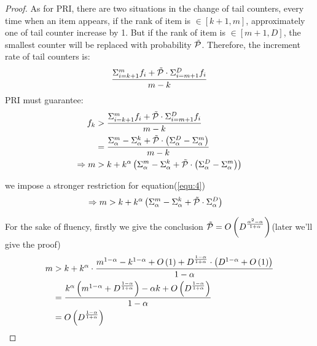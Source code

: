 \begin{proof}
As for PRI, there are two situations in the change of tail counters, every time when an item appears, if the rank of item is $\in[k+1,m]$, approximately one of tail counter increase by 1. But if the rank of item is $\in[m+1,D]$, the smallest counter will be replaced with probability $\Tilde{\mathcal{P}}$.
Therefore, the increment rate of tail counters is:
\begin{equation}
\begin{aligned}
\centering
    \label{equ:5}
    \frac{\Sigma_{i=k+1}^m{f_i}+\Tilde{\mathcal{P}}\cdot\Sigma_{i=m+1}^D{f_i}}{m-k}
\end{aligned}
\end{equation}   
PRI must guarantee:
\begin{equation}
\begin{aligned}
\centering  
    f_k &> \frac{\Sigma_{i=k+1}^m{f_i}+\Tilde{\mathcal{P}}\cdot\Sigma_{i=m+1}^D{f_i}}{m-k}\\
        &= \frac{\Sigma_\alpha^m-\Sigma_\alpha^k+\Tilde{\mathcal{P}}\cdot\left(\Sigma_\alpha^D-\Sigma_\alpha^m\right)}{m-k}\\
    \Rightarrow m &> k + k^\alpha\left(\Sigma_\alpha^m-\Sigma_\alpha^k+\Tilde{\mathcal{P}}\cdot\left(\Sigma_\alpha^D-\Sigma_\alpha^m\right)\right)
\end{aligned}
\end{equation}

we impose a stronger restriction for equation(\ref{equ:4}) 
\begin{equation}
\begin{aligned}
\centering
    \label{equ:6}
    \Rightarrow m &> k + k^\alpha\left(\Sigma_\alpha^m-\Sigma_\alpha^k+\Tilde{\mathcal{P}}\cdot\Sigma_\alpha^D\right)
\end{aligned}
\end{equation} 

For the sake of fluency, firstly we give the conclusion $\Tilde{\mathcal{P}} = O\left(D^{\frac{\alpha^2-\alpha}{1+\alpha}}\right)$(later we'll give the proof)
\begin{equation}
\begin{aligned}
\centering  
    m &> k + k^\alpha\cdot\frac{m^{1-\alpha}-k^{1-\alpha}+O\left(1\right)+D^\frac{1-\alpha}{1+\alpha}\cdot \left(D^{1-\alpha}+O\left(1\right)\right)}{1-\alpha}\\
    &= \frac{k^\alpha\left(m^{1-\alpha}+D^\frac{1-\alpha}{1+\alpha}\right)-\alpha k+O\left(D^\frac{1-\alpha}{1+\alpha}\right)}{1-\alpha}\\
    &= O\left(D^\frac{1-\alpha}{1+\alpha}\right)
\end{aligned}
\end{equation} 


\end{proof}
